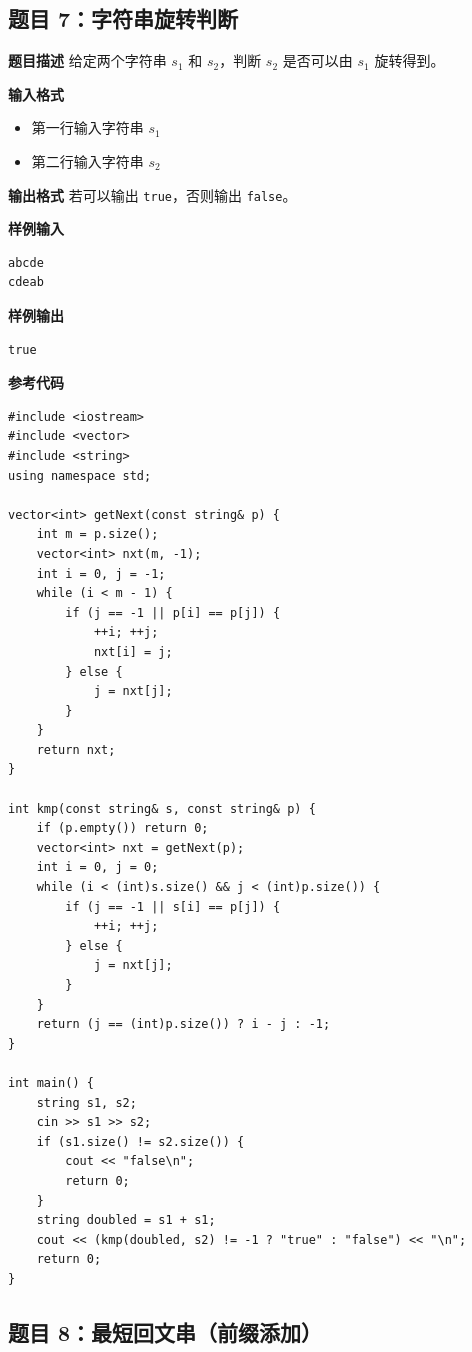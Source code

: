 \documentclass[12pt,a4paper]{article}
\begin{document}
\subsection*{题目 7：字符串旋转判断}

\textbf{题目描述}  
给定两个字符串 $s_1$ 和 $s_2$，判断 $s_2$ 是否可以由 $s_1$ 旋转得到。

\textbf{输入格式}
\begin{itemize}
    \item 第一行输入字符串 $s_1$
    \item 第二行输入字符串 $s_2$
\end{itemize}

\textbf{输出格式}  
若可以输出 \texttt{true}，否则输出 \texttt{false}。

\textbf{样例输入}
\begin{lstlisting}
abcde
cdeab
\end{lstlisting}

\textbf{样例输出}
\begin{lstlisting}
true
\end{lstlisting}

\textbf{参考代码}
\begin{lstlisting}
#include <iostream>
#include <vector>
#include <string>
using namespace std;

vector<int> getNext(const string& p) {
    int m = p.size();
    vector<int> nxt(m, -1);
    int i = 0, j = -1;
    while (i < m - 1) {
        if (j == -1 || p[i] == p[j]) {
            ++i; ++j;
            nxt[i] = j;
        } else {
            j = nxt[j];
        }
    }
    return nxt;
}

int kmp(const string& s, const string& p) {
    if (p.empty()) return 0;
    vector<int> nxt = getNext(p);
    int i = 0, j = 0;
    while (i < (int)s.size() && j < (int)p.size()) {
        if (j == -1 || s[i] == p[j]) {
            ++i; ++j;
        } else {
            j = nxt[j];
        }
    }
    return (j == (int)p.size()) ? i - j : -1;
}

int main() {
    string s1, s2;
    cin >> s1 >> s2;
    if (s1.size() != s2.size()) {
        cout << "false\n";
        return 0;
    }
    string doubled = s1 + s1;
    cout << (kmp(doubled, s2) != -1 ? "true" : "false") << "\n";
    return 0;
}
\end{lstlisting}

\subsection*{题目 8：最短回文串（前缀添加）}
\end{document}
